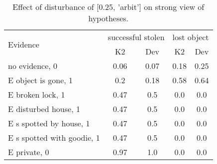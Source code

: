 \begin{table}\begin{tabular}{l|cc|cc}\toprule\multirow{2}{*}{Evidence} & \multicolumn{2}{c}{successful stolen}& \multicolumn{2}{c}{lost object}\\& {K2} & {Dev}& {K2} & {Dev}\\\midrule
no evidence, 0 & 0.06&0.07&\cellcolor{Bittersweet}0.18&\cellcolor{Bittersweet}0.25\\E object is gone, 1 & 0.2&0.18&\cellcolor{Bittersweet}0.58&\cellcolor{Bittersweet}0.64\\E broken lock, 1 & 0.47&0.5&0.0&0.0\\E disturbed house, 1 & 0.47&0.5&0.0&0.0\\E s spotted by house, 1 & 0.47&0.5&0.0&0.0\\E s spotted with goodie, 1 & 0.47&0.5&0.0&0.0\\E private, 0 & 0.97&1.0&0.0&0.0\\\bottomrule\end{tabular}\caption{Effect of disturbance of [0.25, 'arbit'] on strong view of hypotheses.}\end{table}